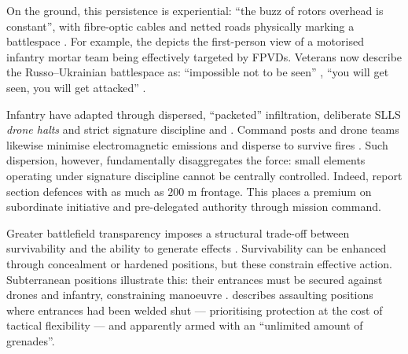 { 




On the ground, this persistence is experiential: ``the buzz of rotors overhead is constant'', with fibre-optic cables and netted roads physically marking a battlespace \parencite{miller_2026}. For example, the \textcite{225_oshp_2025_12_24_FPV_HUNT_INf} depicts the first-person view of a motorised infantry mortar team being effectively targeted by FPVDs. Veterans now describe the Russo--Ukrainian battlespace as: ``impossible not to be seen'' \textcite{dan_participant_1}, ``you will get seen, you will get attacked'' \parencite{garand_thumb_CUAS_2026_3_15}.

Infantry have adapted through dispersed, ``packeted'' infiltration, deliberate SLLS \textit{drone halts} and strict signature discipline \parencite{dan_participant_1,dan_participant_6,fred_participant_9,ZABRODSKYI_2022} and \parencite[8:11--8:23]{civdiv_3}. Command posts and drone teams likewise minimise electromagnetic emissions and disperse to survive fires \parencite{Watling_book}. Such dispersion, however, fundamentally disaggregates the force: small elements operating under signature discipline cannot be centrally controlled. Indeed, \textcite[9]{WATLING_2025B} report section defences with as much as $200$ m frontage. This places a premium on subordinate initiative and pre-delegated authority through mission command.


Greater battlefield transparency imposes a structural trade-off between survivability and the ability to generate effects \parencite[4:36--6:06]{WATLING_2023_book_launch}. Survivability can be enhanced through concealment or hardened positions, but these constrain effective action. Subterranean positions illustrate this: their entrances must be secured against drones and infantry, constraining manoeuvre \parencite{civdiv_2}. \textcite{darragh_participant_4} describes assaulting positions where entrances had been welded shut --- prioritising protection at the cost of tactical flexibility --- and apparently armed with an ``unlimited amount of grenades''.

}
